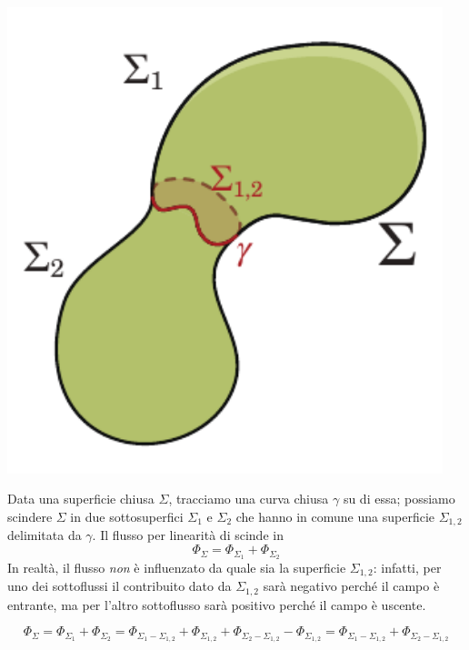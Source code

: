 \begin{observe}
	~\\
	\begin{minipage}{0.34\textwidth}
		\begin{center}
			\includegraphics[width=0.95\textwidth]{images/chp2/chp2oss.pdf}
		\end{center}
	\end{minipage}	
	\begin{minipage}{0.65\textwidth}	
	Data una superficie chiusa $\Sigma$, tracciamo una curva chiusa $\gamma$ su di essa; possiamo scindere $\Sigma$ in due sottosuperfici $\Sigma_1$ e $\Sigma_2$ che hanno in comune una superficie $\Sigma_{1,2}$ delimitata da $\gamma$.
	Il flusso per linearità di scinde in
	\begin{equation*}
		\Phi_{\Sigma}=\Phi_{\Sigma_1}+\Phi_{\Sigma_2}
	\end{equation*}
	In realtà, il flusso \textit{non} è influenzato da quale sia la superficie  $\Sigma_{1,2}$: infatti, per uno dei sottoflussi il contribuito dato da $ \Sigma_{1,2}$ sarà negativo perché il campo è entrante, ma per l'altro sottoflusso sarà positivo perché il campo è uscente.
\end{minipage}
\begin{equation*}
	\Phi_{\Sigma}=\Phi_{\Sigma_1}+\Phi_{\Sigma_2}=\Phi_{\Sigma_1-\Sigma_{1,2}}+\Phi_{\Sigma_{1,2}}+\Phi_{\Sigma_2-\Sigma_{1,2}}-\Phi_{\Sigma_{1,2}}=\Phi_{\Sigma_1-\Sigma_{1,2}}+\Phi_{\Sigma_2-\Sigma_{1,2}}
\end{equation*}
\end{observe}
